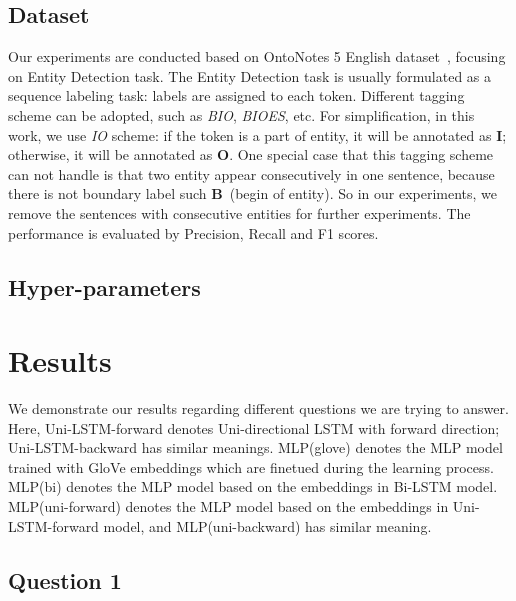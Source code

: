 \documentclass{article}
\begin{document}

\subsection{Dataset} 

Our experiments are conducted based on OntoNotes 5 English dataset~\cite{weischedel2012ontonotes}, focusing on Entity Detection task. The Entity Detection task is usually formulated as a sequence labeling task: labels are assigned to each token. Different tagging scheme can be adopted, such as \textit{BIO}, \textit{BIOES}, etc. For simplification, in this work, we use \textit{IO} scheme: if the token is a part of entity, it will be annotated as \textbf{I}; otherwise, it will be annotated as \textbf{O}. One special case that this tagging scheme can not handle is that two entity appear consecutively in one sentence, because there is not boundary label such \textbf{B}~(begin of entity). So in our experiments, we remove the sentences with consecutive entities for further experiments. The performance is evaluated by Precision, Recall and F1 scores.

\subsection{Hyper-parameters}


\section{Results}

We demonstrate our results regarding different questions we are trying to answer. Here, Uni-LSTM-forward denotes Uni-directional LSTM with forward direction; Uni-LSTM-backward has similar meanings. MLP(glove) denotes the MLP model trained with GloVe embeddings which are finetued during the learning process. MLP(bi) denotes the MLP model based on the embeddings in Bi-LSTM model. MLP(uni-forward) denotes the MLP model based on the embeddings in Uni-LSTM-forward model, and MLP(uni-backward) has similar meaning.

\subsection{Question 1}
\end{document}
